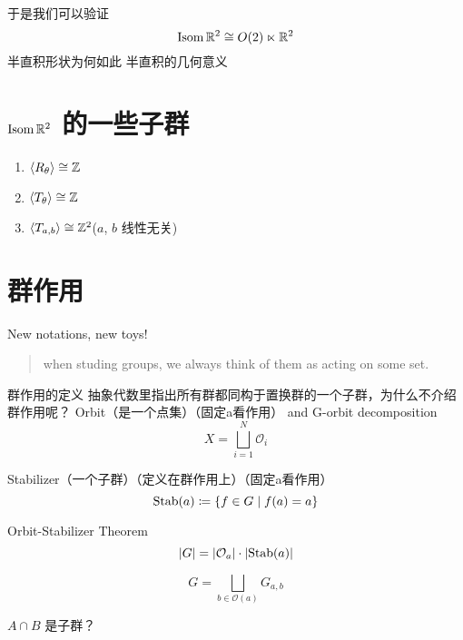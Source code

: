 于是我们可以验证
\[
    \operatorname{\mathrm{Isom}} \mathbb{R}^{2} \cong O(2) \ltimes \mathbb{R}^{2}
\]
半直积形状为何如此
半直积的几何意义

\section{\(\operatorname{\mathrm{Isom}} \mathbb{R}^{2}\) 的一些子群}
\begin{enumerate}
    \item \(\langle R_{\theta} \rangle\cong \mathbb{Z}\)
    \item \(\langle T_{\theta} \rangle\cong \mathbb{Z}\)
    \item \(\langle T_{a,b} \rangle\cong \mathbb{Z}^{2}\)(\(a\), \(b\) 线性无关)
\end{enumerate}

\section{群作用}
New notations, new toys!

\begin{quote}
    when studing groups, we always think of them as acting
    on some set.
\end{quote}

群作用的定义
抽象代数里指出所有群都同构于置换群的一个子群，为什么不介绍群作用呢？
Orbit（是一个点集）（固定a看作用） and G-orbit decomposition
\[
    X=\bigsqcup_{i=1}^{N} \mathcal{O}_{i}
\]

Stabilizer（一个子群）（定义在群作用上）（固定a看作用）
\[
    \operatorname{\mathrm{Stab}}(a)\coloneq \left\{ f \in G \mid f(a)=a \right\}
\]

Orbit-Stabilizer Theorem
\[
    \left| G \right| = \left| \mathcal{O}_{a} \right| \cdot
    \left| \operatorname{\mathrm{Stab}}(a) \right|
\]

\[
    G= \bigsqcup_{b\in \mathcal{O}(a)} G_{a,b}
\]

\(A\cap B\) 是子群？
